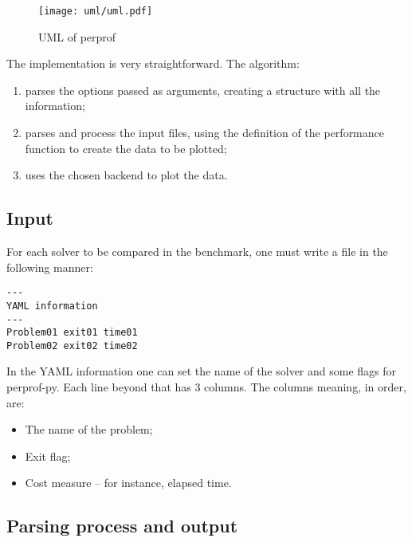     \begin{figure}[!htb]
      \centering
      \texttt{[image: uml/uml.pdf]}
      \caption{UML of perprof}
      \label{fig:uml}
    \end{figure}

    The implementation is very straightforward. The algorithm:
    \begin{enumerate}
      \item parses the options passed as arguments, creating a
        structure with all the information;
      \item parses and process the input files, using the definition
        of the performance function to create the data to be plotted;
      \item uses the chosen backend to plot the data.
    \end{enumerate}

\subsection*{Input}

    For each solver to be compared in the benchmark, one must write a file in
    the following manner:

    \begin{verbatim}
---
YAML information
---
Problem01 exit01 time01
Problem02 exit02 time02
    \end{verbatim}

    In the YAML information one can set the name of the solver and some
    flags for perprof-py.
    Each line beyond that has 3 columns. The columns meaning, in order, are:
    \begin{itemize}
      \item The name of the problem;
      \item Exit flag;
      \item Cost measure -- for instance, elapsed time.
    \end{itemize}

\subsection*{Parsing process and output}

